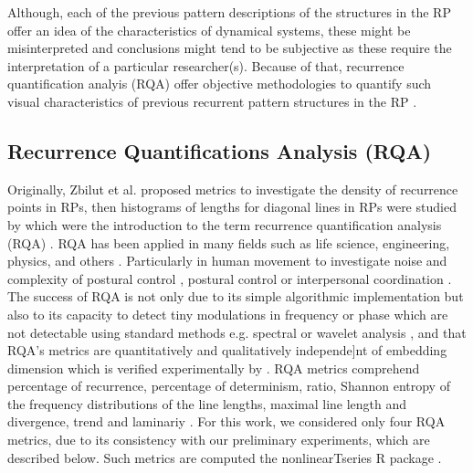 \documentclass[fleqn,10pt]{wlscirep}
\begin{document}

Although, each of the previous pattern descriptions of the structures in the 
RP offer an idea of the characteristics of dynamical systems, 
these might be misinterpreted and conclusions might tend to be subjective 
as these require the interpretation of a particular researcher(s).
Because of that, recurrence quantification analyis (RQA) offer objective 
methodologies to quantify such visual characteristics of previous 
recurrent pattern structures in the RP \cite{zbilut1992}.

\subsection*{Recurrence Quantifications Analysis (RQA)}
Originally, Zbilut et al. \cite{zbilut1992} proposed metrics to investigate 
the density of recurrence points in RPs, then histograms of lengths for 
diagonal lines in RPs were studied by \cite{trulla1996} which were the 
introduction to the term recurrence quantification analysis (RQA) 
\cite{marwan2008}. RQA has been applied in many fields such as life science, 
engineering, physics, and others \cite{marwan2008}. Particularly in human 
movement to investigate noise and complexity of postural control 
\cite{rhea2011}, postural control \cite{apthorp2014} or interpersonal 
coordination \cite{duran2017}. The success of RQA is not only due to its 
simple algorithmic implementation but also to its capacity to detect tiny 
modulations in frequency or phase which are not detectable using standard 
methods e.g. spectral or wavelet analysis \cite{marwan2011}, and that 
RQA's metrics are quantitatively and qualitatively independe]nt of embedding 
dimension which is verified experimentally by \cite{iwanski1998}.
RQA metrics comprehend percentage of recurrence, percentage of determinism, 
ratio, Shannon entropy of the frequency distributions of the line lengths,
maximal line length and divergence, trend and laminariy 
\cite{marwan2007, marwan2015}. For this work, we considered only four 
RQA metrics, due to its consistency with our preliminary experiments, 
which are described below. Such metrics are computed the nonlinearTseries 
R package \cite{nonlinearTseries2016}.
\end{document}
